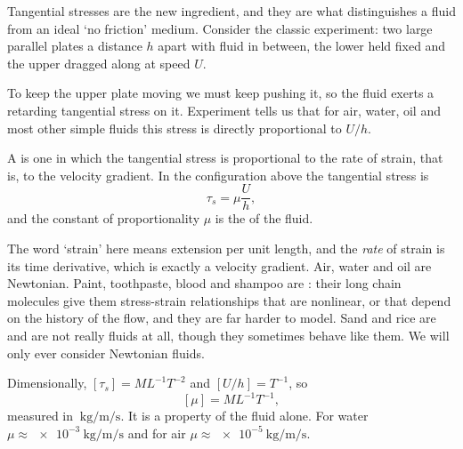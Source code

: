 \documentclass[a4paper]{scrartcl}
\begin{document}
Tangential stresses are the new ingredient, and they are what distinguishes a fluid from an ideal `no friction' medium. Consider the classic experiment: two large parallel plates a distance $h$ apart with fluid in between, the lower held fixed and the upper dragged along at speed $U$.

\begin{center}
\end{center}

To keep the upper plate moving we must keep pushing it, so the fluid exerts a retarding tangential stress on it. Experiment tells us that for air, water, oil and most other simple fluids this stress is directly proportional to $U/h$.

\begin{definition}
	A  is one in which the tangential stress is proportional to the rate of strain, that is, to the velocity gradient. In the configuration above the tangential stress is
	$$
	\tau_s = \mu \frac{U}{h},
	$$
	and the constant of proportionality $\mu$ is the  of the fluid.
\end{definition}

The word `strain' here means extension per unit length, and the \emph{rate} of strain is its time derivative, which is exactly a velocity gradient. Air, water and oil are Newtonian. Paint, toothpaste, blood and shampoo are : their long chain molecules give them stress-strain relationships that are nonlinear, or that depend on the history of the flow, and they are far harder to model. Sand and rice are  and are not really fluids at all, though they sometimes behave like them. We will only ever consider Newtonian fluids.

Dimensionally, $[\tau_s] = M L^{-1} T^{-2}$ and $[U/h] = T^{-1}$, so
$$
[\mu] = M L^{-1} T^{-1},
$$
measured in $\SI{}{\kilo\gram\per\meter\per\second}$. It is a property of the fluid alone. For water $\mu \approx \SI{e-3}{\kilo\gram\per\meter\per\second}$ and for air $\mu \approx \SI{e-5}{\kilo\gram\per\meter\per\second}$.
\end{document}
